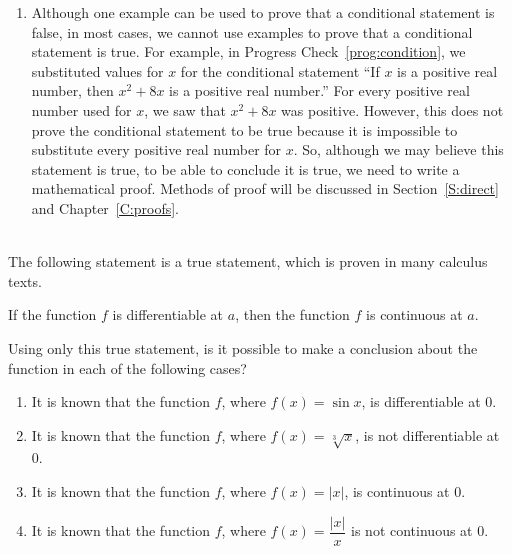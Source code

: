 \begin{enumerate}
\item Although one example can be used to prove that a conditional statement is false, in most cases, we cannot use examples to prove that a conditional statement is true.  For example, in Progress Check~\ref{prog:condition}, we substituted values for $x$ for the conditional statement ``If $x$ is a positive real number, then
\linebreak
$x^2 + 8x$ is a positive real number.''  For every positive real number used for $x$, we saw that $x^2 + 8x$ was positive.  However, this does not prove the conditional statement to be true because it is impossible to substitute every positive real number for $x$.  So, although we may believe this statement is true, to be able to conclude it is true, we need to write a mathematical proof.  Methods of proof will be discussed in Section~\ref{S:direct}  and Chapter~\ref{C:proofs}.
\end{enumerate}
\hbreak


\vskip6pt
\begin{prog}\label{pr:conditional} \hfill \\
The following statement is a true statement, which is proven in many calculus texts.
\begin{center}
If the function  $f$  is differentiable at  $a$, then  the function   $f$  is continuous at  $a$.
\end{center}
\noindent
Using only this true statement, is it possible to make a conclusion about the function in each of the following cases?

\begin{enumerate}
\item It is known that the function  $f$, where   $f(x) = \sin x$, is differentiable at  0.
\item It is known that the function  $f$, where  $f(x) = \sqrt[3]{x}$, is not differentiable at  0.
\item It is known that the function  $f$, where   $f(x) = \left| x \right|$, is continuous at  0.
\item It is known that the function  $f$, where  $f(x) = \dfrac{{\left| x \right|}}{x}$ is not continuous at  0.
\end{enumerate}
\end{prog}
%
%
\hbreak


\endinput
